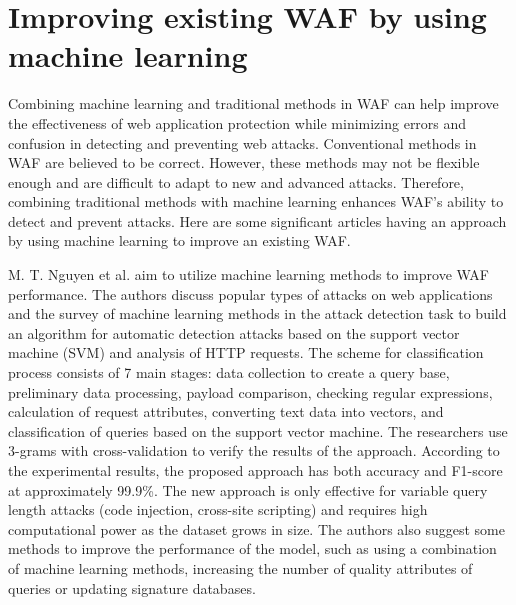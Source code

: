 \section{Improving existing WAF by using machine learning}
\label{sec: improving_waf}
\hspace{0.5cm}Combining machine learning and traditional methods in WAF can help improve the effectiveness of web application protection while minimizing errors and confusion in detecting and preventing web attacks. Conventional methods in WAF are believed to be correct. However, these methods may not be flexible enough and are difficult to adapt to new and advanced attacks. Therefore, combining traditional methods with machine learning enhances WAF's ability to detect and prevent attacks.
Here are some significant articles having an approach by using machine learning to improve an existing WAF. 

M. T. Nguyen et al. \cite{Truong} aim to utilize machine learning methods to improve WAF performance. The authors discuss popular types of attacks on web applications and the survey of machine learning methods in the attack detection task to build an algorithm for automatic detection attacks based on the support vector machine (SVM) and analysis of HTTP requests. The scheme for classification process consists of 7 main stages: data  collection  to create a query base, preliminary data processing, payload comparison, checking regular expressions, calculation of request attributes, converting text data into vectors, and classification of queries based on the support vector machine. The researchers use 3-grams with cross-validation to verify the results of the approach. According to the experimental results, the proposed approach has both accuracy and F1-score at approximately 99.9\%. The new approach is only effective for variable query length attacks (code injection, cross-site scripting) and requires high computational power as the dataset grows in size. The authors also suggest some methods to improve the performance of the model, such as using a combination of machine learning methods, increasing the number of quality attributes of queries or updating signature databases.

